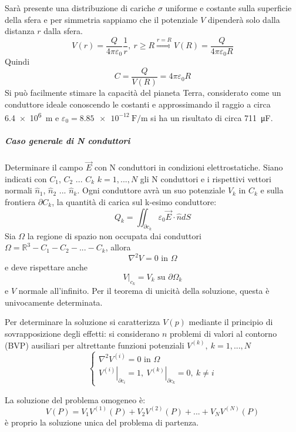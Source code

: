 Sarà presente una distribuzione di cariche $\sigma$ uniforme e costante sulla superficie della sfera
e per simmetria sappiamo che il potenziale $V$ dipenderà solo dalla distanza $r$ dalla sfera.
$$
V(r) = \frac{Q}{4 \pi \varepsilon_0}\frac{1}{r},\ r\geq R \stackrel{r=R}{\Rightarrow} V(R) = 
\frac{Q}{4\pi\varepsilon_0 R}
$$
Quindi 
$$
C = \frac{Q}{V(R)} = 4\pi\varepsilon_0 R
$$
Si può facilmente stimare la capacità del pianeta Terra, considerato come un conduttore ideale
conoscendo le costanti e approssimando il raggio a circa \SI{6.4e6}{\meter} e $\varepsilon_0 = 
\SI{8.85e-12}{\farad\per\meter}$ si ha un risultato di circa \SI{711}{\micro\farad}.

\subparagraph{Caso generale di N conduttori}
Determinare il campo $\vec{E}$ con N conduttori in condizioni elettrostatiche.
Siano indicati con $C_1$, $C_2$ ... $C_k$ $k=1,...,N$ gli N conduttori e i rispettivi vettori normali
$\hat{n}_1$, $\hat{n}_2$ ... $\hat{n}_k$.
Ogni conduttore avrà un suo potenziale $V_k$ in $C_k$ e sulla frontiera $\partial C_k$, la quantità di carica sul k-esimo conduttore:
$$
Q_k = \iint_{\partial c_k} \varepsilon_0 \vec{E}\cdot\hat{n} dS
$$
Sia $\Omega$ la regione di spazio non occupata dai conduttori $\Omega = \mathbb{R}^3 - C_1 - C_2 -... - C_k$, allora
$$
\nabla^2 V = 0 \text{ in } \Omega 
$$
e deve rispettare anche
$$
\left. V \right|_{c_k} = V_k \text{ su } \partial \Omega_k
$$
e $V$ normale all'infinito.
Per il teorema di unicità della soluzione, questa è univocamente determinata.

Per determinare la soluzione si caratterizza $V(p)$ mediante il principio di sovrapposizione degli effetti:
si considerano $n$ problemi di valori al contorno (BVP) ausiliari per altrettante funzioni
potenziali $V^{(k)},\ k=1,...,N$
$$
\begin{cases}
\nabla^2 V^{(i)} = 0 \text{ in } \Omega \\
\left.V^{(i)}\right|_{\partial c_i} =  1,\ \left.V^{(k)}\right|_{\partial c_k} = 0,\ k \neq i
\end{cases}
$$

La soluzione del problema omogeneo è:
$$
V(P) = V_1 V^{(1)}(P) + V_2 V^{(2)}(P) + ... + V_NV^{(N)}(P)
$$
è proprio la soluzione unica del problema di partenza.
